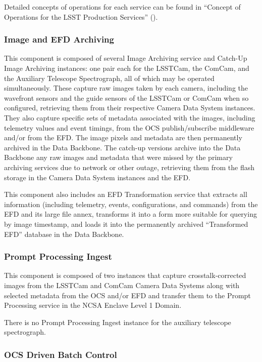 \documentclass[DM,toc]{lsstdoc}
\begin{document}
Detailed concepts of operations for each service can be found in
``Concept of Operations for the LSST Production Services'' ().


\subsubsection{Image and EFD Archiving}\label{image-and-efd-archiving}

This component is composed of several Image Archiving service and
Catch-Up Image Archiving instances: one pair each for the LSSTCam, the
ComCam, and the Auxiliary Telescope Spectrograph, all of which may be
operated simultaneously. These capture raw images taken by each camera,
including the wavefront sensors and the guide sensors of the LSSTCam or
ComCam when so configured, retrieving them from their respective Camera
Data System instances. They also capture specific sets of metadata
associated with the images, including telemetry values and event
timings, from the OCS publish/subscribe middleware and/or from the EFD.
The image pixels and metadata are then permanently archived in the Data
Backbone. The catch-up versions archive into the Data Backbone any raw
images and metadata that were missed by the primary archiving services
due to network or other outage, retrieving them from the flash storage
in the Camera Data System instances and the EFD.

This component also includes an EFD Transformation service that extracts
all information (including telemetry, events, configurations, and
commands) from the EFD and its large file annex, transforms it into a
form more suitable for querying by image timestamp, and loads it into
the permanently archived ``Transformed EFD'' database in the Data
Backbone.

\subsubsection{Prompt Processing Ingest}\label{prompt-processing-ingest}

This component is composed of two instances that capture
crosstalk-corrected images from the LSSTCam and ComCam Camera Data
Systems along with selected metadata from the OCS and/or EFD and
transfer them to the Prompt Processing service in the NCSA Enclave Level
1 Domain.

There is no Prompt Processing Ingest instance for the auxiliary
telescope spectrograph.

\subsubsection{OCS Driven Batch Control}\label{ocs-driven-batch-control}
\end{document}
